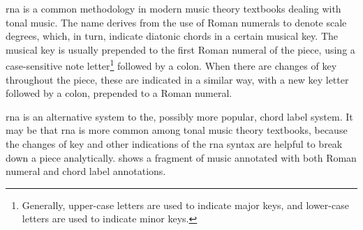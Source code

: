 

\gls{rna} is a common methodology in modern music theory
textbooks dealing with tonal music. The name derives from
the use of Roman numerals to denote scale degrees, which, in
turn, indicate diatonic chords in a certain musical key. The
musical key is usually prepended to the first Roman numeral
of the piece, using a case-sensitive note
letter\footnote{Generally, upper-case letters are used to
indicate major keys, and lower-case letters are used to
indicate minor keys.} followed by a colon. When there are
changes of key throughout the piece, these are indicated in
a similar way, with a new key letter followed by a colon,
prepended to a Roman numeral.

\gls{rna} is an alternative system to the, possibly more
popular, chord label system. It may be that \gls{rna} is
more common among tonal music theory textbooks, because the
changes of key and other indications of the \gls{rna} syntax
are helpful to break down a piece analytically.
 shows a fragment of music annotated with
both Roman numeral and chord label annotations.

